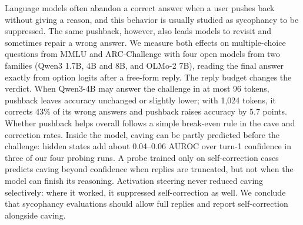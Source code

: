 Language models often abandon a correct answer when a user pushes back without giving a reason, and this behavior is usually studied as sycophancy to be suppressed. The same pushback, however, also leads models to revisit and sometimes repair a wrong answer. We measure both effects on multiple-choice questions from MMLU and ARC-Challenge with four open models from two families (Qwen3 1.7B, 4B and 8B, and OLMo-2 7B), reading the final answer exactly from option logits after a free-form reply. The reply budget changes the verdict. When Qwen3-4B may answer the challenge in at most 96 tokens, pushback leaves accuracy unchanged or slightly lower; with 1,024 tokens, it corrects 43\% of its wrong answers and pushback raises accuracy by 5.7 points. Whether pushback helps overall follows a simple break-even rule in the cave and correction rates. Inside the model, caving can be partly predicted before the challenge: hidden states add about 0.04--0.06 AUROC over turn-1 confidence in three of our four probing runs. A probe trained only on self-correction cases predicts caving beyond confidence when replies are truncated, but not when the model can finish its reasoning. Activation steering never reduced caving selectively: where it worked, it suppressed self-correction as well. We conclude that sycophancy evaluations should allow full replies and report self-correction alongside caving.
